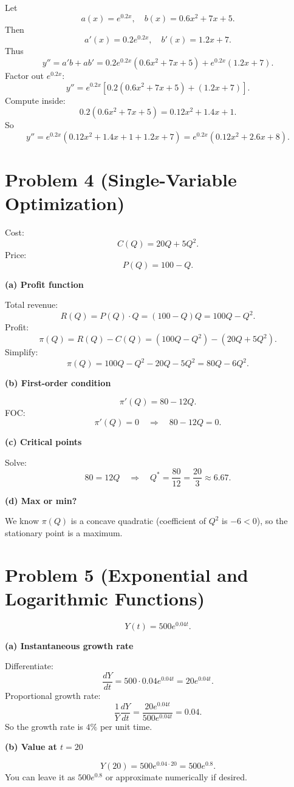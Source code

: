 \documentclass[12pt]{article}
\begin{document}
Let
\[
a(x)=e^{0.2x}, \quad b(x)=0.6x^2 + 7x + 5.
\]
Then
\[
a'(x)=0.2 e^{0.2x}, \quad b'(x)=1.2x + 7.
\]
Thus
\[
y'' = a'b + ab' = 0.2 e^{0.2x}(0.6x^2 + 7x + 5) + e^{0.2x}(1.2x + 7).
\]
Factor out \(e^{0.2x}\):
\[
y'' = e^{0.2x}\left[0.2(0.6x^2 + 7x + 5) + (1.2x + 7)\right].
\]
Compute inside:
\[
0.2(0.6x^2 + 7x + 5) = 0.12x^2 + 1.4x + 1.
\]
So
\[
y'' = e^{0.2x}(0.12x^2 + 1.4x + 1 + 1.2x + 7)
= e^{0.2x}(0.12x^2 + 2.6x + 8).
\]


\section*{Problem 4 (Single-Variable Optimization)}

Cost:
\[
C(Q)=20Q + 5Q^2.
\]
Price:
\[
P(Q)=100 - Q.
\]

\textbf{(a) Profit function}

Total revenue:
\[
R(Q)=P(Q)\cdot Q = (100 - Q)Q = 100Q - Q^2.
\]
Profit:
\[
\pi(Q)=R(Q) - C(Q) = (100Q - Q^2) - (20Q + 5Q^2).
\]
Simplify:
\[
\pi(Q)=100Q - Q^2 - 20Q - 5Q^2 = 80Q - 6Q^2.
\]

\textbf{(b) First-order condition}

\[
\pi'(Q)=80 - 12Q.
\]
FOC:
\[
\pi'(Q)=0 \quad \Rightarrow \quad 80 - 12Q = 0.
\]

\textbf{(c) Critical points}

Solve:
\[
80 = 12Q \quad \Rightarrow \quad Q^\ast = \frac{80}{12} = \frac{20}{3} \approx 6.67.
\]

\textbf{(d) Max or min?}

We know \(\pi(Q)\) is a concave quadratic (coefficient of \(Q^2\) is \(-6<0\)), so the stationary point is a maximum.

\newpage

\section*{Problem 5 (Exponential and Logarithmic Functions)}

\[
Y(t)=500 e^{0.04t}.
\]

\textbf{(a) Instantaneous growth rate}

Differentiate:
\[
\frac{dY}{dt} = 500 \cdot 0.04 e^{0.04t} = 20 e^{0.04t}.
\]
Proportional growth rate:
\[
\frac{1}{Y}\frac{dY}{dt} = \frac{20 e^{0.04t}}{500 e^{0.04t}} = 0.04.
\]
So the growth rate is \(4\%\) per unit time.

\textbf{(b) Value at \(t=20\)}

\[
Y(20)=500 e^{0.04\cdot 20}=500 e^{0.8}.
\]
You can leave it as \(500 e^{0.8}\) or approximate numerically if desired.
\end{document}
